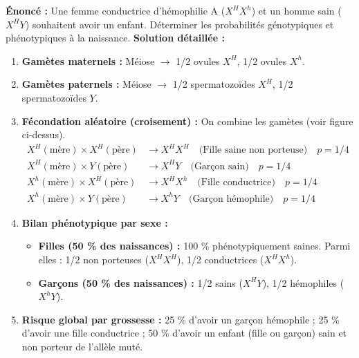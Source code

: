 \documentclass[11pt]{article}
\begin{document}
\begin{exoresolu}
\textbf{Énoncé :} Une femme conductrice d'hémophilie A ($X^H X^h$) et un homme sain ($X^H Y$) souhaitent avoir un enfant. Déterminer les probabilités génotypiques et phénotypiques à la naissance.
\textbf{Solution détaillée :}
\begin{enumerate}
    \item \textbf{Gamètes maternels :} Méiose $\rightarrow$ 1/2 ovules $X^H$, 1/2 ovules $X^h$.
    \item \textbf{Gamètes paternels :} Méiose $\rightarrow$ 1/2 spermatozoïdes $X^H$, 1/2 spermatozoïdes $Y$.
    \item \textbf{Fécondation aléatoire (croisement) :} On combine les gamètes (voir figure ci-dessus).
    \begin{align*}
        X^H (\text{mère}) \times X^H (\text{père}) &\rightarrow X^H X^H \quad \text{(Fille saine non porteuse)} \quad p = 1/4 \\
        X^H (\text{mère}) \times Y (\text{père}) &\rightarrow X^H Y \quad \text{(Garçon sain)} \quad p = 1/4 \\
        X^h (\text{mère}) \times X^H (\text{père}) &\rightarrow X^H X^h \quad \text{(Fille conductrice)} \quad p = 1/4 \\
        X^h (\text{mère}) \times Y (\text{père}) &\rightarrow X^h Y \quad \text{(Garçon hémophile)} \quad p = 1/4
    \end{align*}
    \item \textbf{Bilan phénotypique par sexe :}
    \begin{itemize}
        \item \textbf{Filles (50 \% des naissances) :} 100 \% phénotypiquement saines. Parmi elles : 1/2 non porteuses ($X^H X^H$), 1/2 conductrices ($X^H X^h$).
        \item \textbf{Garçons (50 \% des naissances) :} 1/2 sains ($X^H Y$), 1/2 hémophiles ($X^h Y$).
    \end{itemize}
    \item \textbf{Risque global par grossesse :} 25 \% d'avoir un garçon hémophile ; 25 \% d'avoir une fille conductrice ; 50 \% d'avoir un enfant (fille ou garçon) sain et non porteur de l'allèle muté.
\end{enumerate}
\end{exoresolu}
\end{document}
